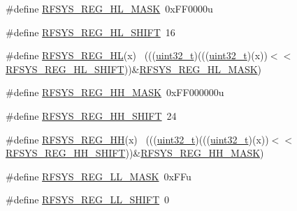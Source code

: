 \begin{DoxyCompactItemize}
\item 
\#define \hyperlink{group___r_f_s_y_s___register___masks_ga063f595b6c7267627c96048590611cc1}{R\+F\+S\+Y\+S\+\_\+\+R\+E\+G\+\_\+\+H\+L\+\_\+\+M\+A\+SK}~0x\+F\+F0000u
\item 
\#define \hyperlink{group___r_f_s_y_s___register___masks_gabc34a2d1963a697d1a773a8981a063f5}{R\+F\+S\+Y\+S\+\_\+\+R\+E\+G\+\_\+\+H\+L\+\_\+\+S\+H\+I\+FT}~16
\item 
\#define \hyperlink{group___r_f_s_y_s___register___masks_ga2181a8fe6350e129761edcd07b9be025}{R\+F\+S\+Y\+S\+\_\+\+R\+E\+G\+\_\+\+HL}(x)                                                ~(((\hyperlink{_p_e___types_8h_a33594304e786b158f3fb30289278f5af}{uint32\+\_\+t})(((\hyperlink{_p_e___types_8h_a33594304e786b158f3fb30289278f5af}{uint32\+\_\+t})(x))$<$$<$\hyperlink{group___r_f_s_y_s___register___masks_gabc34a2d1963a697d1a773a8981a063f5}{R\+F\+S\+Y\+S\+\_\+\+R\+E\+G\+\_\+\+H\+L\+\_\+\+S\+H\+I\+FT}))\&\hyperlink{group___r_f_s_y_s___register___masks_ga063f595b6c7267627c96048590611cc1}{R\+F\+S\+Y\+S\+\_\+\+R\+E\+G\+\_\+\+H\+L\+\_\+\+M\+A\+SK})
\item 
\#define \hyperlink{group___r_f_s_y_s___register___masks_gae1fb55483b3d79a2e74d0c1ad4e57d51}{R\+F\+S\+Y\+S\+\_\+\+R\+E\+G\+\_\+\+H\+H\+\_\+\+M\+A\+SK}~0x\+F\+F000000u
\item 
\#define \hyperlink{group___r_f_s_y_s___register___masks_gae78b067bd28db1d0ff57015f300312fb}{R\+F\+S\+Y\+S\+\_\+\+R\+E\+G\+\_\+\+H\+H\+\_\+\+S\+H\+I\+FT}~24
\item 
\#define \hyperlink{group___r_f_s_y_s___register___masks_ga7d696d8c5f250e7f2a9f11607bbc8506}{R\+F\+S\+Y\+S\+\_\+\+R\+E\+G\+\_\+\+HH}(x)                                                ~(((\hyperlink{_p_e___types_8h_a33594304e786b158f3fb30289278f5af}{uint32\+\_\+t})(((\hyperlink{_p_e___types_8h_a33594304e786b158f3fb30289278f5af}{uint32\+\_\+t})(x))$<$$<$\hyperlink{group___r_f_s_y_s___register___masks_gae78b067bd28db1d0ff57015f300312fb}{R\+F\+S\+Y\+S\+\_\+\+R\+E\+G\+\_\+\+H\+H\+\_\+\+S\+H\+I\+FT}))\&\hyperlink{group___r_f_s_y_s___register___masks_gae1fb55483b3d79a2e74d0c1ad4e57d51}{R\+F\+S\+Y\+S\+\_\+\+R\+E\+G\+\_\+\+H\+H\+\_\+\+M\+A\+SK})
\item 
\#define \hyperlink{group___r_f_s_y_s___register___masks_ga2fe64579aaef18ce266e3d6c316d3241}{R\+F\+S\+Y\+S\+\_\+\+R\+E\+G\+\_\+\+L\+L\+\_\+\+M\+A\+SK}~0x\+F\+Fu
\item 
\#define \hyperlink{group___r_f_s_y_s___register___masks_gaab45c60c0a8e5edb59537ee2bcb2bbcf}{R\+F\+S\+Y\+S\+\_\+\+R\+E\+G\+\_\+\+L\+L\+\_\+\+S\+H\+I\+FT}~0

\end{DoxyCompactItemize}
